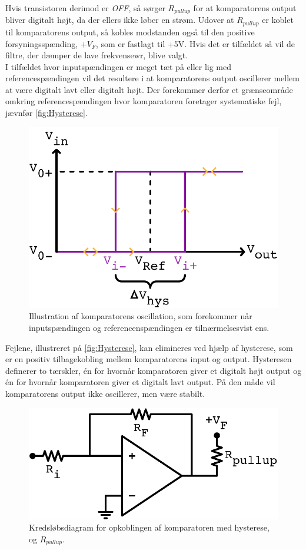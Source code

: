Hvis transistoren derimod er \textit{OFF}, så sørger $R_{pullup}$ for at komparatorens output bliver digitalt højt, da der ellers ikke løber en strøm. Udover at $R_{pullup}$ er koblet til komparatorens output, så kobles modstanden også til den positive forsyningsspænding, $+V_F$, som er fastlagt til +5V. Hvis det er tilfældet så vil de filtre, der dæmper de lave frekvensewr, blive valgt. \\[5mm]
%
I tilfældet hvor inputspændingen er meget tæt på eller lig med referencespændingen vil det resultere i at komparatorens output oscillerer mellem at være digitalt lavt eller digitalt højt. Der forekommer derfor et grænseområde omkring referencespændingen hvor komparatoren foretager systematiske fejl, jævnfør \autoref{fig:Hysterese}. 
%
\begin{figure}[H]
	\centering
	\includegraphics[resolution=300,scale=\circuitSize]{Figure/Circuits/Hysterese.pdf}
	\caption{Illustration af komparatorens oscillation, som forekommer når inputspændingen og referencenspændingen er tilnærmelsesvist ens.}
	\label{fig:Hysterese}
\end{figure}
\noindent
%
Fejlene, illustreret på \autoref{fig:Hysterese}, kan elimineres ved hjælp af hysterese, som er en positiv tilbagekobling mellem komparatorens input og output. Hysteresen definerer to tærskler, én for hvornår komparatoren giver et digitalt højt output og én for hvornår komparatoren giver et digitalt lavt output. På den måde vil komparatorens output ikke oscillerer, men være stabilt. 
%
\begin{figure}[H]
	\centering
	\includegraphics[resolution=300,scale=\circuitSize]{Figure/Circuits/Komparator_Hysterese.pdf}
	\caption{Kredsløbsdiagram for opkoblingen af komparatoren med hysterese, og $R_{pullup}$.}
	\label{fig:Komparator_Hysterese}
\end{figure}
